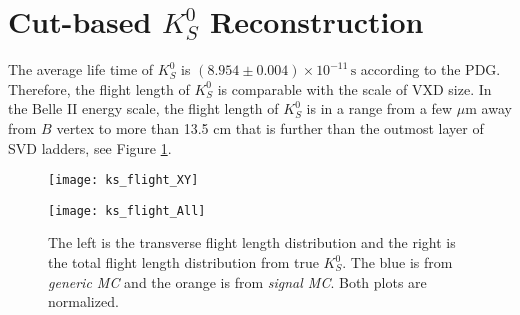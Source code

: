 \section{Cut-based $K_S^0$ Reconstruction}
 The average life time of $K_S^0$ is $(8.954 \pm 0.004) \times 10 ^{-11} \, \text{s}$ according to the PDG. Therefore, the flight length of $K_S^0$ is comparable with the scale of VXD size. In the Belle II energy scale, the flight length of $K_S^0$ is in a range from a few $\mu$m away from $B$ vertex to more than 13.5 cm that is further than the outmost layer of SVD ladders, see Figure \ref{fig:ks_flight}.
 \begin{figure}[htpb]
 	\centering 
 	\begin{minipage}[b]{0.49\linewidth}
 	\texttt{[image: ks\_flight\_XY]}
 	\end{minipage}
	\begin{minipage}[b]{0.49\linewidth}
		\texttt{[image: ks\_flight\_All]}
	\end{minipage}
 	\caption{The left is the transverse flight length distribution and the right is the total flight length distribution from true $K_S^0$.  The blue is from \textit{generic MC} and  the orange is from \textit{signal MC}. Both plots are normalized.}
 	\label{fig:ks_flight}
 \end{figure}
